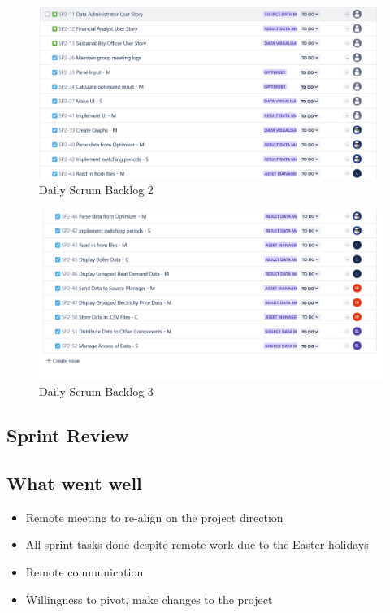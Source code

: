 \documentclass[12pt]{report}
\begin{document}
\begin{figure}[H]
  \centering
  \includegraphics[width=1\textwidth]{Resources/2-Sprint/Daily-Scrum/backlog2.png}
  \caption{Daily Scrum Backlog 2}
  \label{fig:S2Scrum2-image}
\end{figure}

\begin{figure}[H]
  \centering
  \includegraphics[width=1\textwidth]{Resources/2-Sprint/Daily-Scrum/backlog3.png}
  \caption{Daily Scrum Backlog 3}
  \label{fig:S2Scrum3-image}
\end{figure}


\subsection*{Sprint Review}

\subsection*{What went well}
\begin{itemize}
    \item Remote meeting to re-align on the project direction
    \item All sprint tasks done despite remote work due to the Easter holidays
    \item Remote communication
    \item Willingness to pivot, make changes to the project
\end{itemize}
\end{document}
